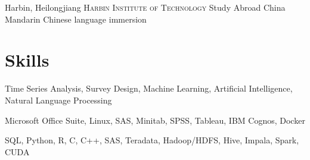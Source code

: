 \documentclass[letterpaper,12pt,color,final]{moderncv}
\begin{document}
{Harbin, Heilongjiang}
{\textsc{Harbin Institute of Technology}}
{Study Abroad}
{China}
{Mandarin Chinese language immersion}

\section{Skills}

{\newline{}
 Time Series Analysis, Survey Design, Machine Learning, Artificial Intelligence, Natural Language Processing}

{\newline{}
 Microsoft Office Suite, Linux, SAS, Minitab, SPSS, Tableau, IBM Cognos, Docker}

{\newline{}
 SQL, Python, R, C, C++, SAS, Teradata, Hadoop/HDFS, Hive, Impala, Spark, CUDA}
\end{document}
